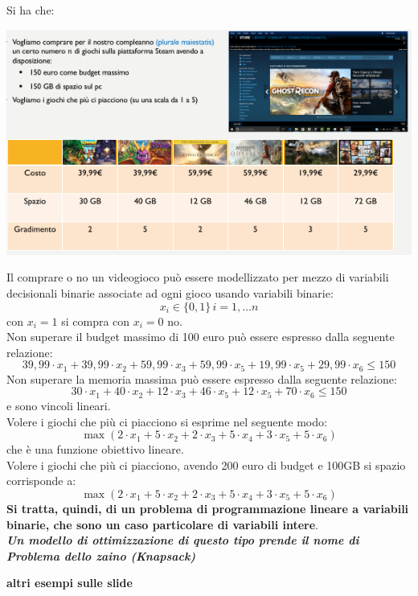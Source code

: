 \documentclass[a4paper,12pt, oneside]{book}
\begin{document}
\begin{esempio}
  Si ha che:
  \begin{center}
    \includegraphics[scale = 0.7]{img/steam.png}
  \end{center}
  Il comprare o no un videogioco può essere modellizzato per mezzo
  di variabili decisionali binarie associate ad ogni gioco usando
  variabili binarie:
  \[x_i\in\{0,1\}\,i=1,\ldots n\]
  con $x_i=1$ si compra con $x_i=0$ no.\\
  Non superare il budget massimo di 100 euro può essere espresso
  dalla seguente relazione:
  \[39,99 \cdot x_1 + 39,99 \cdot x_2 + 59,99 \cdot x_3 + 59,99 \cdot
    x_5 + 19,99 \cdot x_5+ 29,99 \cdot x_6 ≤ 150\]
  Non superare la memoria massima può essere espresso dalla seguente
  relazione:
  \[30 \cdot x_1 + 40 \cdot x_2 + 12 \cdot x_3 + 46 \cdot
    x_5 + 12 \cdot x_5+ 70 \cdot x_6 ≤ 150\]
  e sono vincoli lineari.\\
  Volere i giochi che più ci piacciono si esprime nel seguente modo:
  \[\max(2\cdot x_1+5\cdot x_2+2\cdot x_3+5\cdot x_4+3\cdot x_5+5\cdot x_6)\]
  che è una funzione obiettivo lineare.\\
  Volere i giochi che più ci piacciono, avendo 200 euro di budget e
  100GB si spazio corrisponde a:
  \[\max(2\cdot x_1+5\cdot x_2+2\cdot x_3+5\cdot x_4+3\cdot x_5+5\cdot x_6)\]
  \textbf{Si tratta, quindi, di un problema di programmazione lineare a
    variabili binarie, che sono un caso particolare di variabili
    intere}.\\
  \textbf{\textit{Un modello di ottimizzazione di questo tipo prende
      il nome di Problema dello zaino (Knapsack)}}
\end{esempio}
\textbf{altri esempi sulle slide}
\end{document}
